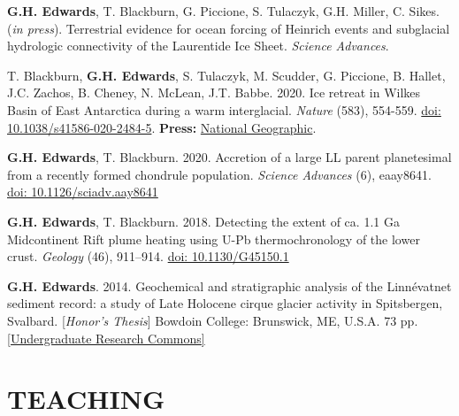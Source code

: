 \documentclass[10pt]{article}
\newcommand{\ghedwards}{\textbf{G.H. Edwards}}
\begin{document}
\begin{etaremune} [itemsep=4pt, leftmargin=3ex]
\item \ghedwards, T. Blackburn, G. Piccione, S. Tulaczyk, G.H. Miller, C. Sikes. (\textit{in press}). Terrestrial evidence for ocean forcing of Heinrich events and subglacial hydrologic connectivity of the Laurentide Ice Sheet. \textit{Science Advances}.
\item T. Blackburn, \ghedwards, S. Tulaczyk, M. Scudder, G. Piccione, B. Hallet, J.C. Zachos, B. Cheney, N. McLean, J.T. Babbe. 2020. Ice retreat in Wilkes Basin of East Antarctica during a warm interglacial. \textit{Nature} (583), 554-559. \href{https://doi.org/10.1038/s41586-020-2484-5}{doi: 10.1038/s41586-020-2484-5}. \textbf{Press:} \href{https://www.nationalgeographic.com/science/2020/07/east-antarctic-ice-sheet-more-vulnerable-to-melting-than-thought/}{National Geographic}.
\item \ghedwards, T. Blackburn. 2020. Accretion of a large LL parent planetesimal from a recently formed chondrule population. \textit{Science Advances} (6), eaay8641. \href{https://advances.sciencemag.org/content/6/16/eaay8641}{doi: 10.1126/sciadv.aay8641}
\item \ghedwards, T. Blackburn. 2018. Detecting the extent of ca. 1.1 Ga Midcontinent Rift plume heating using U-Pb thermochronology of the lower crust. \textit{Geology} (46), 911–914. \href{https://doi.org/10.1130/G45150.1}{doi: 10.1130/G45150.1} 
\item \ghedwards. 2014. Geochemical and stratigraphic analysis of the Linnévatnet sediment record: a study of Late Holocene cirque glacier activity in Spitsbergen, Svalbard. [\textit{Honor’s Thesis}] Bowdoin College: Brunswick, ME, U.S.A. 73 pp. \href{https://digitalcommons.bowdoin.edu/honorsprojects/12/}{[Undergraduate Research Commons]}
\end{etaremune}


\section*{TEACHING}
\end{document}
